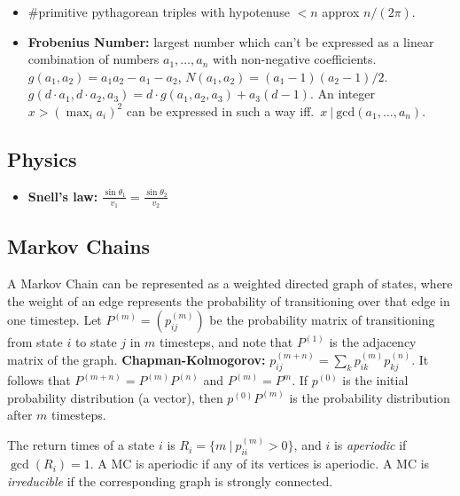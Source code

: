 \documentclass[8pt,a4paper,landscape,oneside]{amsart}
\begin{document}
\begin{multicols*}{3}
\begin{itemize}[leftmargin=*]
            \item \#primitive pythagorean triples with hypotenuse $<n$ approx $n/(2\pi)$.
            \item \textbf{Frobenius Number:} largest number which can't be
                expressed as a linear combination of numbers $a_1,\ldots,a_n$
                with non-negative coefficients. $g(a_1,a_2) = a_1a_2-a_1-a_2$,
                $N(a_1,a_2)=(a_1-1)(a_2-1)/2$. $g(d\cdot a_1,d\cdot a_2,a_3) =
                d\cdot g(a_1,a_2,a_3) + a_3(d-1)$. An integer $x>\left(\max_i
                a_i\right)^2$ can be expressed in such a way iff.\ $x\ |\
                \mathrm{gcd}(a_1,\ldots,a_n)$.
        \end{itemize}

        \subsection{Physics}
            \begin{itemize}
                \item \textbf{Snell's law:} $\frac{\sin\theta_1}{v_1} = \frac{\sin\theta_2}{v_2}$
            \end{itemize}

        \subsection{Markov Chains}
            A Markov Chain can be represented as a weighted directed graph of
            states, where the weight of an edge represents the probability of
            transitioning over that edge in one timestep. Let $P^{(m)} = (p^{(m)}_{ij})$
            be the probability matrix of transitioning from state $i$ to state $j$
            in $m$ timesteps, and note that $P^{(1)}$ is the adjacency matrix of
            the graph. \textbf{Chapman-Kolmogorov:} $p^{(m+n)}_{ij} = \sum_{k}
            p^{(m)}_{ik} p^{(n)}_{kj}$. It follows that $P^{(m+n)} =
            P^{(m)}P^{(n)}$ and $P^{(m)} = P^m$. If $p^{(0)}$ is the initial
            probability distribution (a vector), then $p^{(0)}P^{(m)}$ is the
            probability distribution after $m$ timesteps.

            The return times of a state $i$ is $R_i = \{m\ |\ p^{(m)}_{ii} > 0 \}$,
            and $i$ is \textit{aperiodic} if $\gcd(R_i) = 1$. A MC is aperiodic if
            any of its vertices is aperiodic. A MC is \textit{irreducible} if the
            corresponding graph is strongly connected.


\end{multicols*}
\end{document}
